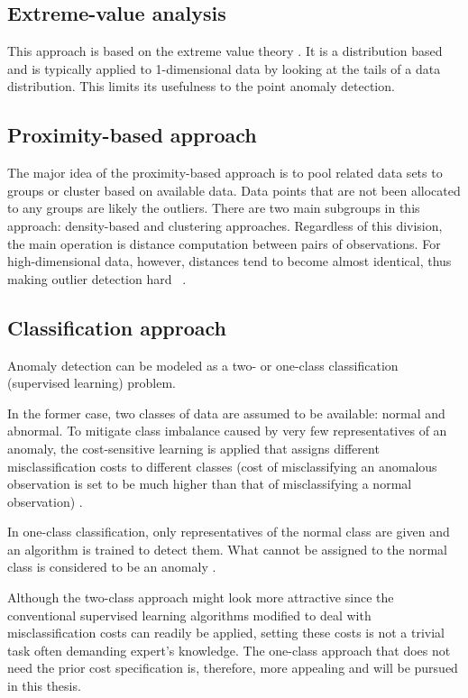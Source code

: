 \subsection{Extreme-value analysis}\label{extremevalue}
This approach is based on the extreme value theory \cite{Castillo:2004}. It is a distribution based and is typically applied to 1-dimensional data by looking at the tails of a data distribution. This limits its usefulness to the point anomaly detection.

\subsection{Proximity-based approach}\label{proximity}
The major idea of the proximity-based approach is to pool related data sets to groups or cluster based on available data. Data points that are not been allocated to any groups are likely the outliers. There are two main subgroups in this approach: density-based and clustering approaches. Regardless of this division, the main operation is distance computation between pairs of observations. For high-dimensional data, however, distances tend to become almost identical, thus making outlier detection hard ~\cite{Aggarwal:2013}. 

\subsection{Classification approach}\label{classification}
Anomaly detection can be modeled as a two- or one-class classification (supervised learning) problem. 

In the former case, two classes of data are assumed to be available: normal and abnormal. To mitigate class imbalance caused by very few representatives of an anomaly, the cost-sensitive learning is applied that assigns different misclassification costs to different classes (cost of misclassifying an anomalous observation is set to be much higher than that of misclassifying a normal observation) \cite{Elkan:2001:FCL:1642194.1642224}.

In one-class classification, only representatives of the normal class are given and an algorithm is trained to detect them. What cannot be assigned to the normal class is considered to be an anomaly \cite{Amer:2013:EOS:2500853.2500857}.

Although the two-class approach might look more attractive since the conventional supervised learning algorithms modified to deal with misclassification costs can readily be applied, setting these costs is not a trivial task often demanding expert's knowledge. The one-class approach that does not need the prior cost specification is, therefore, more appealing and will be pursued in this thesis. 

